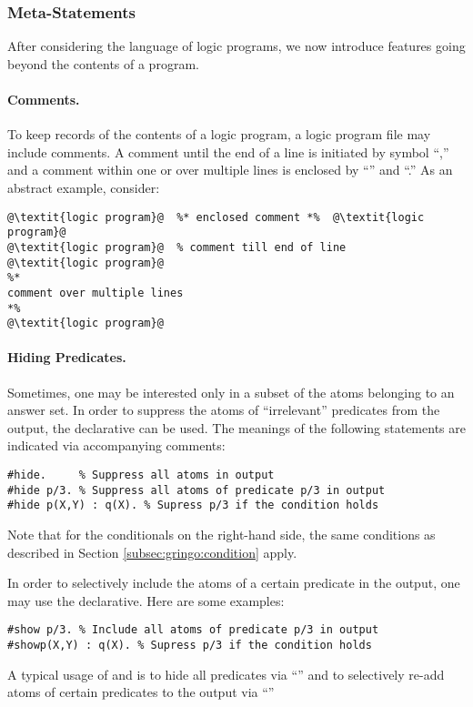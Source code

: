 \subsubsection{Meta-Statements}\label{subsec:gringo:meta}

After considering the language of logic programs,
we now introduce features going beyond the contents of a program.

\paragraph{Comments.}
To keep records of the contents of a logic program,
a logic program file may include comments.
A comment until the end of a line is initiated by symbol ``\code{\%},''
and a comment within one or over multiple lines is enclosed
by ``\code{\%*}'' and ``\code{*\%}.''
As an abstract example, consider:
%
\begin{lstlisting}[numbers=none,escapechar=@]
@\textit{logic program}@  %* enclosed comment *%  @\textit{logic program}@
@\textit{logic program}@  % comment till end of line
@\textit{logic program}@
%*
comment over multiple lines
*%
@\textit{logic program}@
\end{lstlisting}

\paragraph{Hiding Predicates.}
Sometimes, one may be interested only in a subset of the atoms belonging
to an answer set.
In order to suppress the atoms of ``irrelevant'' predicates from the output,
the  declarative can be used.
The meanings of the following statements are indicated via accompanying comments:
%
\begin{lstlisting}[numbers=none]
#hide.     % Suppress all atoms in output
#hide p/3. % Suppress all atoms of predicate p/3 in output
#hide p(X,Y) : q(X). % Supress p/3 if the condition holds
\end{lstlisting}
Note that for the conditionals on the right-hand side, 
the same conditions as described in Section \ref{subsec:gringo:condition} apply.

In order to selectively include the atoms of a certain predicate in the output,
one may use the  declarative.
Here are some examples:
%
\begin{lstlisting}[numbers=none]
#show p/3. % Include all atoms of predicate p/3 in output
#showp(X,Y) : q(X). % Supress p/3 if the condition holds
\end{lstlisting}
%
A typical usage of  and  is to hide all predicates
via ``'' and to selectively re-add atoms of certain predicates
 to the output via ``''

